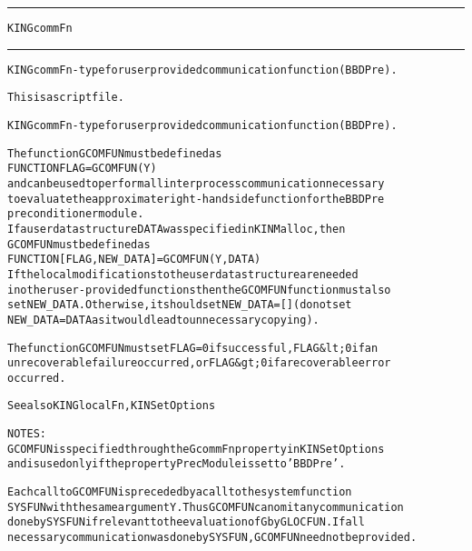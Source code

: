 \begin{samepage}
\hrule
\begin{center}
{\large \verb!KINGcommFn!}
\label{p:KINGcommFn}
\end{center}
\hrule\vspace{0.1in}



\begin{alltt}
KINGcommFn - type for user provided communication function (BBDPre).
\end{alltt}

\end{samepage}



\begin{samepage}


\begin{alltt}
This is a script file. 
\end{alltt}

\end{samepage}



\begin{alltt}
KINGcommFn - type for user provided communication function (BBDPre).

   The function GCOMFUN must be defined as 
        FUNCTION FLAG = GCOMFUN(Y)
   and can be used to perform all interprocess communication necessary
   to evaluate the approximate right-hand side function for the BBDPre
   preconditioner module.
   If a user data structure DATA was specified in KINMalloc, then
   GCOMFUN must be defined as
        FUNCTION [FLAG, NEW_DATA] = GCOMFUN(Y, DATA)
   If the local modifications to the user data structure are needed 
   in other user-provided functions then the GCOMFUN function must also 
   set NEW_DATA. Otherwise, it should set NEW_DATA=[] (do not set 
   NEW_DATA = DATA as it would lead to unnecessary copying).

   The function GCOMFUN must set FLAG=0 if successful, FLAG&lt;0 if an
   unrecoverable failure occurred, or FLAG&gt;0 if a recoverable error
   occurred.

   See also KINGlocalFn, KINSetOptions

   NOTES:
     GCOMFUN is specified through the GcommFn property in KINSetOptions
     and is used only if the property PrecModule is set to 'BBDPre'.

     Each call to GCOMFUN is preceded by a call to the system function
     SYSFUN with the same argument Y. Thus GCOMFUN can omit any communication
     done by SYSFUN if relevant to the evaluation of G by GLOCFUN. If all
     necessary communication was done by SYSFUN, GCOMFUN need not be provided.
\end{alltt}






\vspace{0.1in}